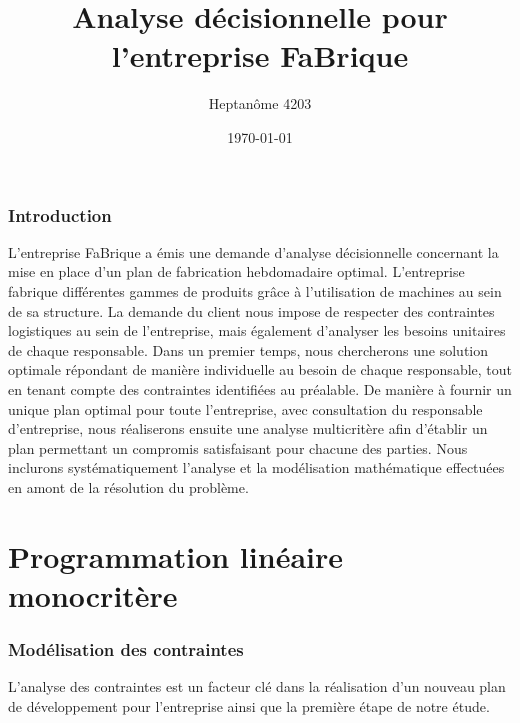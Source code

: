 \documentclass[a4paper,10pt]{article}
\title{Analyse décisionnelle pour l'entreprise FaBrique}
\author{Heptanôme 4203}
\date{\today}
\begin{document}
\maketitle 


\section*{Introduction}

  L'entreprise FaBrique a émis une demande d'analyse décisionnelle concernant la mise en place d'un plan de fabrication hebdomadaire optimal. L'entreprise fabrique différentes gammes de produits grâce à l'utilisation de machines au sein de sa structure. La demande du client nous impose de respecter des contraintes logistiques au sein de l'entreprise, mais également d'analyser les besoins unitaires de chaque responsable. Dans un premier temps, nous chercherons une solution optimale répondant de manière individuelle au besoin de chaque responsable, tout en tenant compte des contraintes identifiées au préalable. De manière à fournir un unique plan optimal pour toute l'entreprise, avec consultation du responsable d'entreprise, nous réaliserons ensuite une analyse multicritère afin d'établir un plan permettant un compromis satisfaisant pour chacune des parties. Nous inclurons systématiquement l'analyse et la modélisation mathématique effectuées en amont de la résolution du problème.
  
\newpage
\tableofcontents

\newpage
\part{Programmation linéaire monocritère}


\section{Modélisation des contraintes}
L'analyse des contraintes est un facteur clé dans la réalisation d'un nouveau plan de développement pour l'entreprise ainsi que la première étape de notre étude.
\vspace{\baselineskip}
\end{document}
